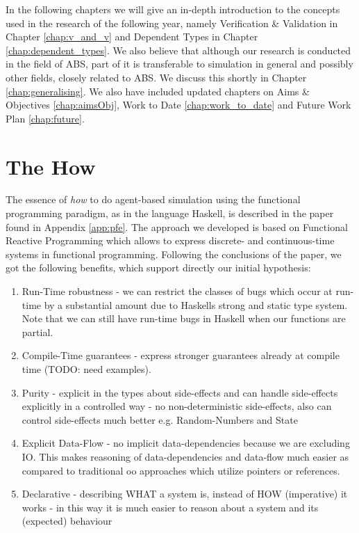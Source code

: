 In the following chapters we will give an in-depth introduction to the concepts used in the research of the following year, namely Verification \& Validation in Chapter \ref{chap:v_and_v} and Dependent Types in Chapter \ref{chap:dependent_types}. We also believe that although our research is conducted in the field of ABS, part of it is transferable to simulation in general and possibly other fields, closely related to ABS. We discuss this shortly in Chapter \ref{chap:generalising}. We also have included updated chapters on Aims \& Objectives \ref{chap:aimsObj}, Work to Date \ref{chap:work_to_date} and Future Work Plan \ref{chap:future}.

\section{The How}
The essence of \textit{how} to do agent-based simulation using the functional programming paradigm, as in the language Haskell, is described in the paper found in Appendix \ref{app:pfe}. The approach we developed is based on Functional Reactive Programming which allows to express discrete- and continuous-time systems in functional programming. Following the conclusions of the paper, we got the following benefits, which support directly our initial hypothesis:
\begin{enumerate}
	\item Run-Time robustness - we can restrict the classes of bugs which occur at run-time by a substantial amount due to Haskells strong and static type system. Note that we can still have run-time bugs in Haskell when our functions are partial.
	\item Compile-Time guarantees - express stronger guarantees already at compile time (TODO: need examples).
	\item Purity - explicit in the types about side-effects and can handle side-effects explicitly in a controlled way - no non-deterministic side-effects, also can control side-effects much better e.g. Random-Numbers and State
	\item Explicit Data-Flow - no implicit data-dependencies because we are excluding IO. This makes reasoning of data-dependencies and data-flow much easier as compared to traditional oo approaches which utilize pointers or references.
	\item Declarative - describing WHAT a system is, instead of HOW (imperative) it works - in this way it is much easier to reason about a system and its (expected) behaviour 
\end{enumerate}

